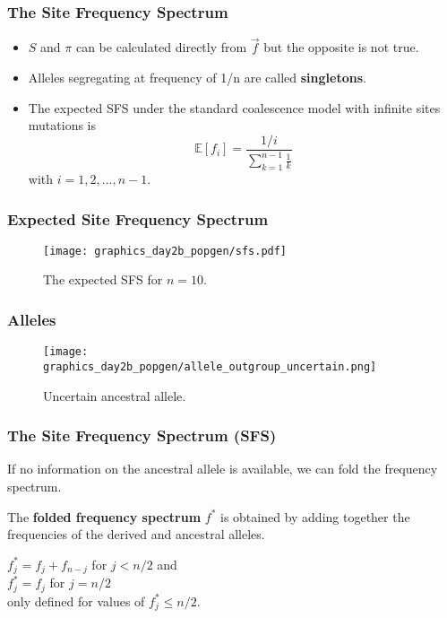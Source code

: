 \documentclass{beamer}
\newcommand{\E}{\mathbb{E}}
\newcommand{\1}{\ensuremath{\mathbf{1}}}
\begin{document}
\begin{frame}\frametitle{The Site Frequency Spectrum}
	\begin{itemize}
		\item $S$ and $\pi$ can be calculated directly from $\vec{f}$ but the opposite is not true.
		\item Alleles segregating at frequency of 1/n are called \textbf{singletons}.
		\item The expected SFS under the standard coalescence model with
infinite sites mutations is
			\begin{equation}
				\E[f_i] = \frac{1/i}{\sum_{k=1}^{n-1}\tfrac{1}{k}}
			\end{equation}
			with $i = 1,2,\ldots,n-1$.
	\end{itemize}
\end{frame}
%
%
%
\begin{frame}\frametitle{Expected Site Frequency Spectrum}
	\begin{figure}
	\begin{center}
		\texttt{[image: graphics\_day2b\_popgen/sfs.pdf]}
	\end{center}
	\caption{The expected SFS for $n=10$.}
	\end{figure}
\end{frame}
%
%
%
\begin{frame}\frametitle{Alleles}
	\begin{figure}
	\begin{center}
		\texttt{[image: graphics\_day2b\_popgen/allele\_outgroup\_uncertain.png]}
	\end{center}
	\caption{Uncertain ancestral allele.}
	\end{figure}
\end{frame}
%
%
%
\begin{frame}\frametitle{The Site Frequency Spectrum (SFS)}
	If no information on the ancestral allele is available, we can fold the frequency spectrum.
	\begin{block}{}
		The \textbf{folded frequency spectrum} $f^*$ is obtained by adding together the frequencies of the derived and ancestral alleles.
	\end{block}
	$f^*_j = f_j+f_{n-j}$ for $j<n/2$ and\\
	$f^*_j = f_j$ for $j=n/2$\\
	only defined for values of $f^*_j \leq n/2$.
\end{frame}
\end{document}
